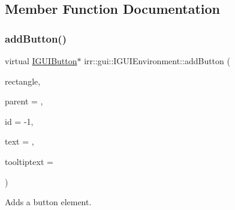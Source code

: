 \subsection{Member Function Documentation}
\mbox{\label{classirr_1_1gui_1_1IGUIEnvironment_a666749b7352a677c74acb242199e54a0}} 
\subsubsection{\texorpdfstring{add\+Button()}{addButton()}}
{\footnotesize\ttfamily virtual \hyperlink{classirr_1_1gui_1_1IGUIButton}{I\+G\+U\+I\+Button}$\ast$ irr\+::gui\+::\+I\+G\+U\+I\+Environment\+::add\+Button (\begin{DoxyParamCaption}\item[{const \hyperlink{classirr_1_1core_1_1rect}{core\+::rect}$<$ \hyperlink{namespaceirr_ac66849b7a6ed16e30ebede579f9b47c6}{s32} $>$ \&}]{rectangle,  }\item[{\hyperlink{classirr_1_1gui_1_1IGUIElement}{I\+G\+U\+I\+Element} $\ast$}]{parent = {},  }\item[{\hyperlink{namespaceirr_ac66849b7a6ed16e30ebede579f9b47c6}{s32}}]{id = {\ttfamily -\/1},  }\item[{const wchar\+\_\+t $\ast$}]{text = {},  }\item[{const wchar\+\_\+t $\ast$}]{tooltiptext = {} }\end{DoxyParamCaption})\hspace{0.3cm}{\ttfamily [pure virtual]}}



Adds a button element. 



